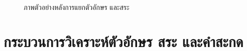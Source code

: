 \documentclass[12pt,oneside,openright,a4paper]{cpe-thai-project}
\begin{document}
\begin{figure}[!ht]\centering
  \setlength{\fboxrule}{0.2mm} %
  \setlength{\fboxsep}{1cm}
  \caption{ภาพตัวอย่างหลังการแยกตัวอักษร และสระ}\label{fig:childrenTestSplitAlphabet}
\end{figure}
\newpage
\section{กระบวนการวิเคราะห์ตัวอักษร สระ และคำสะกด}
\end{document}
